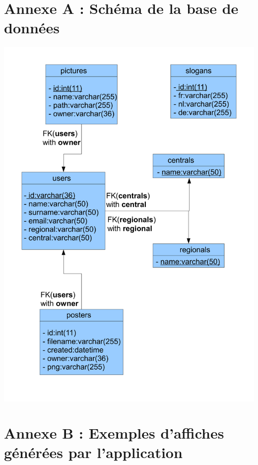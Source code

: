 \documentclass{article}
\begin{document}
\begin{sffamily}
\appendix

\section{Annexe A : Schéma de la base de données}\label{schemabdd}

\begin{center} \includegraphics[width=\textwidth]{bdd.pdf} \end{center}

\newpage

\section{Annexe B : Exemples d'affiches générées par l'application}\label{exemple}


\end{sffamily}
\end{document}
